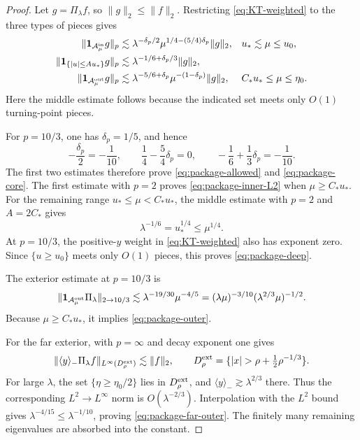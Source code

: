 \documentclass[11pt,a4paper]{amsart}
\numberwithin{equation}{section}
\newcommand{\one}{\mathbf 1}
\newcommand{\norm}[1]{\lVert #1\rVert}
\begin{document}
\begin{proof}
Let \(g=\Pi_\lambda f\), so \(\norm g_2\le\norm f_2\). Restricting
\eqref{eq:KT-weighted} to the three types of pieces gives
\begin{align*}
 \norm{\one_{\mathcal A_\mu^{\rm in}}g}_p
 &\lesssim
 \lambda^{-\delta_p/2}
 \mu^{1/4-(5/4)\delta_p}\norm g_2,
 &&u_*\lesssim\mu\le u_0,\\
 \norm{\one_{\{|u|\le Au_*\}}g}_p
 &\lesssim
 \lambda^{-1/6+\delta_p/3}\norm g_2,\\
 \norm{\one_{\mathcal A_\mu^{\rm out}}g}_p
 &\lesssim
 \lambda^{-5/6+\delta_p}
 \mu^{-(1-\delta_p)}\norm g_2,
 &&C_*u_*\le\mu\le\eta_0.
\end{align*}
Here the middle estimate follows because the indicated set meets only
\(O(1)\) turning-point pieces.

For \(p=10/3\), one has \(\delta_p=1/5\), and hence
\[
 -\frac{\delta_p}{2}=-\frac1{10},\qquad
 \frac14-\frac54\delta_p=0,
 \qquad
 -\frac16+\frac13\delta_p=-\frac1{10}.
\]
The first two estimates therefore prove \eqref{eq:package-allowed} and
\eqref{eq:package-core}. The first estimate with \(p=2\) proves
\eqref{eq:package-inner-L2} when \(\mu\ge C_*u_*\).
For the remaining range
\(u_*\le\mu<C_*u_*\), the middle estimate
with \(p=2\) and \(A=2C_*\) gives
\[
 \lambda^{-1/6}=u_*^{1/4}\le\mu^{1/4}.
\]
At
\(p=10/3\), the positive-\(y\) weight in \eqref{eq:KT-weighted} also has
exponent zero. Since
\(\{u\ge u_0\}\) meets only \(O(1)\) pieces, this proves
\eqref{eq:package-deep}.

The exterior estimate at \(p=10/3\) is
\[
 \norm{\one_{\mathcal A_\mu^{\rm out}}\Pi_\lambda}_{2\to10/3}
 \lesssim\lambda^{-19/30}\mu^{-4/5}
 =(\lambda\mu)^{-3/10}(\lambda^{2/3}\mu)^{-1/2}.
\]
Because \(\mu\ge C_*u_*\), it implies
\eqref{eq:package-outer}.

For the far exterior, \cite[Theorem~3(b)]{KochTataru} with \(p=\infty\)
and decay exponent one gives
\[
 \norm{\langle y\rangle_-\Pi_\lambda f}_{L^\infty(D_\rho^{\rm ext})}
 \lesssim\norm f_2,
 \qquad
 D_\rho^{\rm ext}=\{|x|>\rho+\tfrac12\rho^{-1/3}\}.
\]
For large \(\lambda\), the set \(\{\eta\ge\eta_0/2\}\) lies in
\(D_\rho^{\rm ext}\), and \(\langle y\rangle_-\gtrsim\lambda^{2/3}\)
there. Thus the corresponding \(L^2\to L^\infty\) norm is
\(O(\lambda^{-2/3})\). Interpolation with the \(L^2\) bound gives
\(\lambda^{-4/15}\le\lambda^{-1/10}\), proving
\eqref{eq:package-far-outer}. The finitely many remaining eigenvalues are
absorbed into the constant.
\end{proof}
\end{document}
